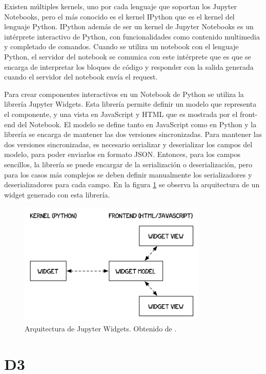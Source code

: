 Existen múltiples kernels, uno por cada lenguaje que soportan los Jupyter Notebooks, pero el más conocido es el kernel IPython que es el kernel del lenguaje Python. IPython además de ser un kernel de Jupyter Notebooks es un intérprete interactivo de Python, con funcionalidades como contenido multimedia y completado de comandos. Cuando se utiliza un notebook con el lenguaje Python, el servidor del notebook se comunica con este intérprete que es que se encarga de interpretar los bloques de código y responder con la salida generada cuando el servidor del notebook envía el request.

Para crear componentes interactivos en un Notebook de Python se utiliza la librería Jupyter Widgets. Esta librería permite definir un modelo que representa el componente, y una vista en JavaScript y HTML que es mostrada por el front-end del Notebook. El modelo se define tanto en JavaScript como en Python y la librería se encarga de mantener las dos versiones sincronizadas. Para mantener las dos versiones sincronizadas, es necesario serializar y deserializar los campos del modelo, para poder enviarlos en formato JSON. Entonces, para los campos sencillos, la librería se puede encargar de la serialización o deserialización, pero para los casos más complejos se deben definir manualmente los serializadores y deserializadores para cada campo. En la figura \ref{fig:widget_arq} se observa la arquitectura de un widget generado con esta librería.

\begin{figure}[htb]
  \centering
  \includegraphics[width=0.8\textwidth]{imagenes/notebook/WidgetModelView}
  \caption[Arquitectura de Jupyter Widgets]{Arquitectura de Jupyter Widgets. Obtenido de \cite{arq-widget}.}
  \label{fig:widget_arq}
\end{figure}

\section{D3}

